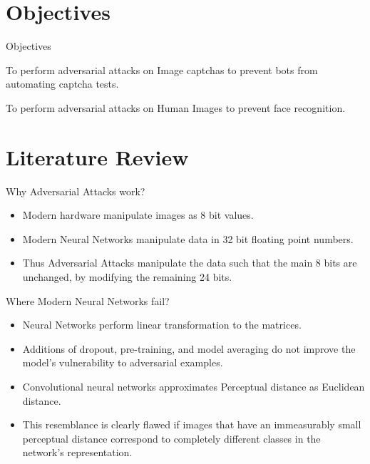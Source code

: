 \documentclass[10pt]{beamer}
\begin{document}
\section{Objectives}
\begin{frame}{Objectives}
    
    \item To perform adversarial attacks on Image captchas to prevent bots from automating captcha tests.
    \item To perform adversarial attacks on Human Images to prevent face recognition. 
    

\end{frame}

\section{Literature Review}
\begin{frame}{Why Adversarial Attacks work?}
    
    \begin{itemize}
        \item Modern hardware manipulate images as 8 bit values.
        \item Modern Neural Networks manipulate data in 32 bit floating point numbers.
        \item Thus Adversarial Attacks manipulate the data such that the main 8 bits are unchanged, by modifying the remaining 24 bits.
    \end{itemize}
      
\end{frame}

\begin{frame}{Where Modern Neural Networks fail?}
    
    \begin{itemize}
       \item  Neural Networks perform linear transformation to the matrices.
       \item  Additions of dropout, pre-training, and model averaging do not improve the model’s vulnerability to adversarial examples.
       \item Convolutional neural networks approximates Perceptual distance as Euclidean distance.
       \item This resemblance is clearly flawed if images that have an
        immeasurably small perceptual distance correspond to completely different classes in the network’s representation.
     \end{itemize}   

\end{frame}
\end{document}
